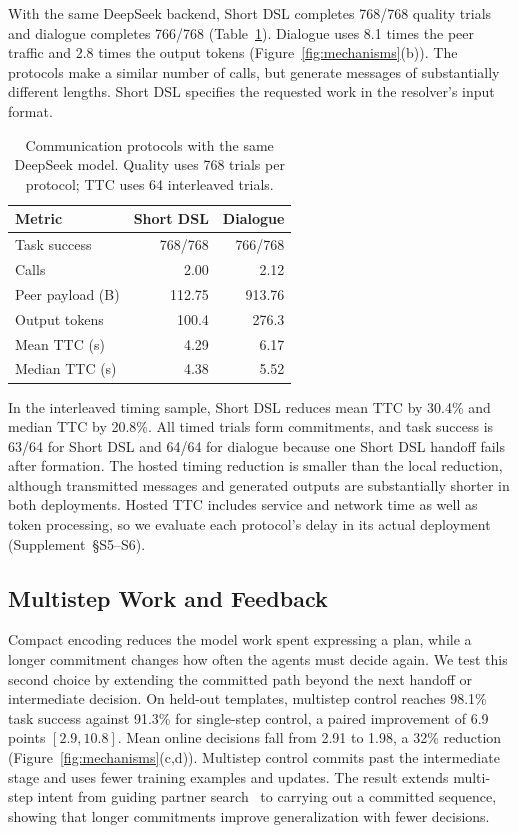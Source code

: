 \documentclass[sigconf,nonacm,balance=false]{aamas}
\newcommand{\tabstyle}{\small\setlength{\tabcolsep}{3pt}\renewcommand{\arraystretch}{1.10}}
\begin{document}
With the same DeepSeek backend, Short DSL completes 768/768 quality trials and dialogue completes 766/768 (Table~\ref{tab:prompted-main}). Dialogue uses 8.1 times the peer traffic and 2.8 times the output tokens (Figure~\ref{fig:mechanisms}(b)). The protocols make a similar number of calls, but generate messages of substantially different lengths. Short DSL specifies the requested work in the resolver's input format.

\begin{table}[t]
\centering\tabstyle
\caption{Communication protocols with the same DeepSeek model. Quality uses 768 trials per protocol; TTC uses 64 interleaved trials.}
\label{tab:prompted-main}
\begin{tabular}{@{}lrr@{}}\toprule
Metric & Short DSL & Dialogue\\\midrule
Task success & 768/768 & 766/768\\
Calls & 2.00 & 2.12\\
Peer payload (B) & 112.75 & 913.76\\
Output tokens & 100.4 & 276.3\\
\midrule
Mean TTC (s) & 4.29 & 6.17\\
Median TTC (s) & 4.38 & 5.52\\\bottomrule
\end{tabular}
\end{table}

In the interleaved timing sample, Short DSL reduces mean TTC by 30.4\% and median TTC by 20.8\%. All timed trials form commitments, and task success is 63/64 for Short DSL and 64/64 for dialogue because one Short DSL handoff fails after formation. The hosted timing reduction is smaller than the local reduction, although transmitted messages and generated outputs are substantially shorter in both deployments. Hosted TTC includes service and network time as well as token processing, so we evaluate each protocol's delay in its actual deployment (Supplement~\mbox{\S S5--S6}).

\subsection{Multistep Work and Feedback}
\label{sec:horizon-results}\label{sec:feedback-results}
Compact encoding reduces the model work spent expressing a plan, while a longer commitment changes how often the agents must decide again. We test this second choice by extending the committed path beyond the next handoff or intermediate decision. On held-out templates, multistep control reaches 98.1\% task success against 91.3\% for single-step control, a paired improvement of 6.9 points $[2.9,10.8]$. Mean online decisions fall from 2.91 to 1.98, a 32\% reduction (Figure~\ref{fig:mechanisms}(c,d)). Multistep control commits past the intermediate stage and uses fewer training examples and updates. The result extends multi-step intent from guiding partner search~\cite{aamas2025_p481} to carrying out a committed sequence, showing that longer commitments improve generalization with fewer decisions.
\end{document}
